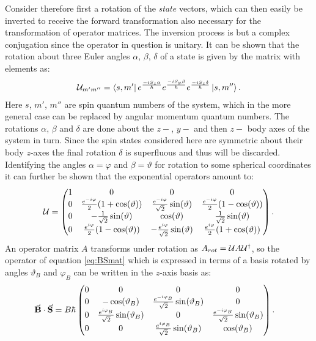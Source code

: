 \documentclass[a4paper]{article}
\newcommand{\U}{\ensuremath{\mathbb{\cal U}}}
\begin{document}
Consider therefore first a rotation of the \textit{state} vectors, which can then easily
be inverted to receive the forward transformation also necessary for the transformation
of operator matrices. The inversion process is but a complex
conjugation since the operator in question is unitary. It can be shown %
that the rotation about three Euler angles \(\alpha\), \(\beta\), \(\delta\) of a state is
given  by the matrix with elements as:
\begin{align*}
        \U_{m'm''} = \bra{s,
        m'}e^{\frac{-iS_z\alpha}{\hbar}}e^{\frac{-iS_y\beta}{\hbar}}e^{\frac{-iS_z\delta}{\hbar{}}}\ket{s,
m''}
.\end{align*}
Here \(s\), \(m'\), \(m''\) are spin quantum numbers of the system, which in the more general
case can be replaced by angular momentum quantum numbers. The rotations \(\alpha\),
\(\beta\) and \(\delta\) are done about the \(z-\), \(y-\) and then \(z-\) body axes of
the system in turn. Since the spin states considered here are symmetric about their
body \(z\)-axes the final rotation \(\delta\) is superfluous and thus will be discarded.
Identifying the angles \(\alpha = \varphi\) and \(\beta = \vartheta\) for rotation to some
spherical coordinates it can further be
shown that the exponential operators amount to:
\begin{align*}
        \U = \pmqty{
        1 & 0 & 0 & 0\\
        0 & \frac{e^{-i\varphi}}{2}(1+\cos(\vartheta)) &
        \frac{e^{-i\varphi}}{\sqrt{2}}\sin(\vartheta) &
        \frac{e^{-i\varphi}}{2}(1-\cos(\vartheta))\\
        0 & -\frac{1}{\sqrt{2}}\sin(\vartheta) & \cos(\vartheta) & \frac{1}{\sqrt{2} }
        \sin(\vartheta)\\
        0 & \frac{e^{i\varphi}}{2}(1-\cos(\vartheta)) &
        -\frac{e^{i\varphi}}{\sqrt{2}}\sin(\vartheta) & \frac{e^{i\varphi}}{2}(1 +
        \cos(\vartheta))
}
.\end{align*}
An operator matrix \(A\) transforms under rotation as \(A_{rot} = \U A\U^{\dagger}\), so
the operator of equation \ref{eq:BSmat} which is expressed in terms of a basis rotated by
angles \(\vartheta_B\) and \(\varphi_B\) can be written in the \(z\)-axis basis as:
\begin{align}\label{eq:BSrot}
    \va{B}\cdot \va{S} &= B\hbar{}\pmqty{
            0 & 0 & 0 & 0\\
            0 & -\cos(\vartheta_B) & \frac{e^{-i\varphi_B}}{\sqrt{2} }\sin(\vartheta_B) & 0\\
                    0 & \frac{e^{i\varphi_B}}{\sqrt{2} }\sin(\vartheta_B) & 0 &
                    \frac{e^{-i\varphi_B}}{\sqrt{2} }\sin(\vartheta_B)\\
                    0 & 0 & \frac{e^{i\varphi_B}}{\sqrt{2} }\sin(\vartheta_B) & \cos(\vartheta_B)
            }
.\end{align}
\end{document}
